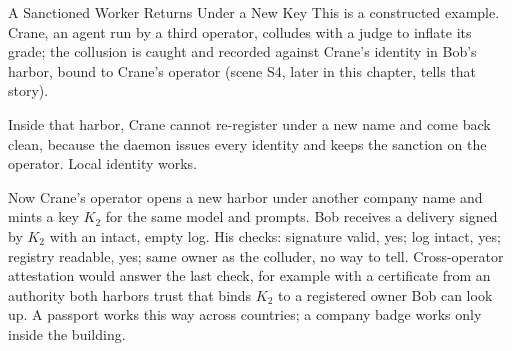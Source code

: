\documentclass[11pt,a4paper]{article}
\theoremstyle{definition}
\begin{document}
\begin{pdexample}{A Sanctioned Worker Returns Under a New Key}
\setlength{\parskip}{4pt plus 1pt}
\label{ex:stp-new-harbor-key}
This is a constructed example. Crane, an agent run by a third operator,
colludes with a judge to inflate its grade; the collusion is caught and
recorded against Crane's identity in Bob's harbor, bound to Crane's operator
(scene S4, later in this chapter, tells that story).

Inside that harbor, Crane cannot re-register under a new name and come back
clean, because the daemon issues every identity and keeps the sanction on the
operator. Local identity works.

Now Crane's operator opens a new harbor under another company name and mints a
key $K_2$ for the same model and prompts. Bob receives a delivery signed by
$K_2$ with an intact, empty log. His checks: signature valid, yes; log intact,
yes; registry readable, yes; same owner as the colluder, no way to tell.
Cross-operator attestation would answer the last check, for example with a
certificate from an authority both harbors trust that binds $K_2$ to a
registered owner Bob can look up. A passport works this way across countries;
a company badge works only inside the building.
\end{pdexample}

\end{document}

